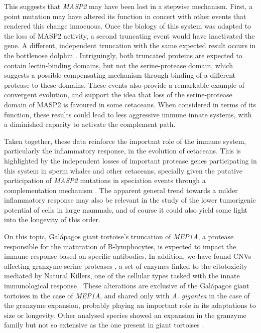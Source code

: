 This suggests that \textit{MASP2} may have been lost in a stepwise mechanism.
First, a point mutation may have altered its function in concert with other events that rendered this change innocuous.
Once the biology of this system was adapted to the loss of MASP2 activity, a second truncating event would have inactivated the gene.  
A different, independent truncation with the same expected result occurs in the bottlenose dolphin%
.
Intriguingly, both truncated proteins are expected to contain lectin-binding domains, but not the serine-protease domain, which suggests a possible compensating mechanism through binding of a different protease to these domains.
These events also provide a remarkable example of convergent evolution, and support the idea that loss of the serine-protease domain of MASP2 is favoured in some cetaceans.
When considered in terms of its function, these results could lead to less aggressive immune innate systems, with a diminished capacity to activate the complement path.

Taken together, these data reinforce the important role of the immune system, particularly the inflammatory response, in the evolution of cetaceans.
This is highlighted by the independent losses of important protease genes participating in this system in sperm whales and other cetaceans, specially given the putative participation of \textit{MASP2} mutations in speciation events through a complementation mechanism \cite{Kondrashov2002}.
The apparent general trend towards a milder inflammatory response may also be relevant in the study of the lower tumorigenic potential of cells in large mammals, and of course it could also yield some light into the longevity of this order.

On this topic, Gal\'{a}pagos giant tortoise's truncation of \textit{MEP1A}, a protease responsible for the maturation of B-lymphocytes, is expected to impact the immune response based on specific antibodies.
In addition, we have found CNVs affecting granzyme serine proteases%
, a set of enzymes linked to the citotoxicity mediated by Natural Killers, one of the cellular types tasked with the innate immunological response \cite{Voskoboinik2015}.
These alterations are exclusive of the Gal\'{a}pagos giant tortoises in the case of \textit{MEP1A}, and shared only with \textit{A. gigantea} in the case of the granzyme expansion, probably playing an important role in its adaptations to size or longevity.
Other analysed species showed an expansion in the granzyme family but not so extensive as the one present in giant tortoises%
.


